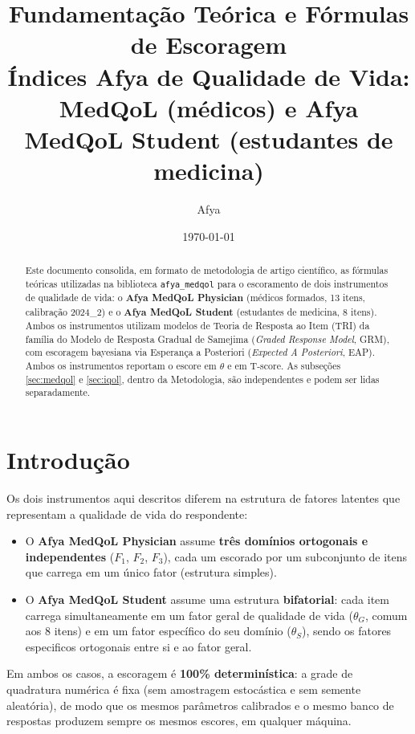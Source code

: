 \documentclass[12pt,a4paper]{article}
\title{Fundamentação Teórica e Fórmulas de Escoragem\\[2pt]
\large Índices Afya de Qualidade de Vida: MedQoL (médicos) e Afya MedQoL Student (estudantes de medicina)}
\author{Afya}
\date{\today}
\begin{document}
\maketitle

\begin{abstract}
\noindent
Este documento consolida, em formato de metodologia de artigo científico, as
fórmulas teóricas utilizadas na biblioteca \texttt{afya\_medqol} para o
escoramento de dois instrumentos de qualidade de vida: o \textbf{Afya MedQoL Physician}
(médicos formados, 13 itens, calibração 2024\_2) e o \textbf{Afya MedQoL Student} (estudantes
de medicina, 8 itens). Ambos os instrumentos utilizam modelos de Teoria de
Resposta ao Item (TRI) da família do Modelo de Resposta Gradual de Samejima
(\emph{Graded Response Model}, GRM), com escoragem bayesiana via Esperança a
Posteriori (\emph{Expected A Posteriori}, EAP). Ambos os instrumentos
reportam o escore em $\theta$ e em T-score. As subseções
\ref{sec:medqol} e \ref{sec:iqol}, dentro da Metodologia, são
independentes e podem ser lidas separadamente.
\end{abstract}

\tableofcontents

\section{Introdução}

Os dois instrumentos aqui descritos diferem na estrutura de fatores latentes
que representam a qualidade de vida do respondente:

\begin{itemize}
    \item O \textbf{Afya MedQoL Physician} assume \textbf{três domínios ortogonais e
    independentes} ($F_1$, $F_2$, $F_3$), cada um escorado por um subconjunto
    de itens que carrega em um único fator (estrutura simples).
    \item O \textbf{Afya MedQoL Student} assume uma estrutura \textbf{bifatorial}: cada item
    carrega simultaneamente em um fator geral de qualidade de vida
    ($\theta_G$, comum aos 8 itens) e em um fator específico do seu domínio
    ($\theta_{S}$), sendo os fatores especificos ortogonais entre si e ao
    fator geral.
\end{itemize}

Em ambos os casos, a escoragem é \textbf{100\% determinística}: a grade de
quadratura numérica é fixa (sem amostragem estocástica e sem semente
aleatória), de modo que os mesmos parâmetros calibrados e o mesmo banco de
respostas produzem sempre os mesmos escores, em qualquer máquina.
\end{document}
